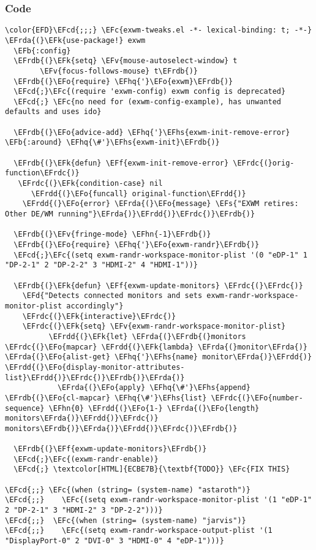 \documentclass[a4wide,10pt]{article}
\newcommand{\EFc}[1]{\textcolor{EFc}{#1}} %
\newcommand{\EFcd}[1]{\textcolor{EFcd}{#1}} %
\newcommand{\EFs}[1]{\textcolor{EFs}{#1}} %
\newcommand{\EFd}[1]{\textcolor{EFd}{#1}} %
\newcommand{\EFk}[1]{\textcolor{EFk}{#1}} %
\newcommand{\EFb}[1]{\textcolor{EFb}{#1}} %
\newcommand{\EFf}[1]{\textcolor{EFf}{#1}} %
\newcommand{\EFv}[1]{\textcolor{EFv}{#1}} %
\newcommand{\EFo}[1]{\textcolor{EFo}{#1}} %
\newcommand{\EFhn}[1]{\textcolor{EFhn}{\textbf{#1}}} %
\newcommand{\EFhq}[1]{\textcolor{EFhq}{#1}} %
\newcommand{\EFhs}[1]{\textcolor{EFhs}{#1}} %
\newcommand{\EFrda}[1]{\textcolor{EFrda}{#1}} %
\newcommand{\EFrdb}[1]{\textcolor{EFrdb}{#1}} %
\newcommand{\EFrdc}[1]{\textcolor{EFrdc}{#1}} %
\newcommand{\EFrdd}[1]{\textcolor{EFrdd}{#1}} %
\begin{document}
\subsubsection{Code}
\label{sec:org6f3a383}
\begin{Code}
\begin{Verbatim}
\color{EFD}\EFcd{;;;} \EFc{exwm-tweaks.el -*- lexical-binding: t; -*-}
\EFrda{(}\EFk{use-package!} exwm
  \EFb{:config}
  \EFrdb{(}\EFk{setq} \EFv{mouse-autoselect-window} t
        \EFv{focus-follows-mouse} t\EFrdb{)}
  \EFrdb{(}\EFo{require} \EFhq{'}\EFo{exwm}\EFrdb{)}
  \EFcd{;}\EFc{(require 'exwm-config) exwm config is deprecated}
  \EFcd{;} \EFc{no need for (exwm-config-example), has unwanted defaults and uses ido}

  \EFrdb{(}\EFo{advice-add} \EFhq{'}\EFhs{exwm-init-remove-error} \EFb{:around} \EFhq{\#'}\EFhs{exwm-init}\EFrdb{)}

  \EFrdb{(}\EFk{defun} \EFf{exwm-init-remove-error} \EFrdc{(}orig-function\EFrdc{)}
   \EFrdc{(}\EFk{condition-case} nil
      \EFrdd{(}\EFo{funcall} original-function\EFrdd{)}
    \EFrdd{(}\EFo{error} \EFrda{(}\EFo{message} \EFs{"EXWM retires: Other DE/WM running"}\EFrda{)}\EFrdd{)}\EFrdc{)}\EFrdb{)}

  \EFrdb{(}\EFv{fringe-mode} \EFhn{-1}\EFrdb{)}
  \EFrdb{(}\EFo{require} \EFhq{'}\EFo{exwm-randr}\EFrdb{)}
  \EFcd{;}\EFc{(setq exwm-randr-workspace-monitor-plist '(0 "eDP-1" 1 "DP-2-1" 2 "DP-2-2" 3 "HDMI-2" 4 "HDMI-1"))}

  \EFrdb{(}\EFk{defun} \EFf{exwm-update-monitors} \EFrdc{(}\EFrdc{)}
    \EFd{"Detects connected monitors and sets exwm-randr-workspace-monitor-plist accordingly"}
    \EFrdc{(}\EFk{interactive}\EFrdc{)}
    \EFrdc{(}\EFk{setq} \EFv{exwm-randr-workspace-monitor-plist}
          \EFrdd{(}\EFk{let} \EFrda{(}\EFrdb{(}monitors \EFrdc{(}\EFo{mapcar} \EFrdd{(}\EFk{lambda} \EFrda{(}monitor\EFrda{)} \EFrda{(}\EFo{alist-get} \EFhq{'}\EFhs{name} monitor\EFrda{)}\EFrdd{)} \EFrdd{(}\EFo{display-monitor-attributes-list}\EFrdd{)}\EFrdc{)}\EFrdb{)}\EFrda{)}
            \EFrda{(}\EFo{apply} \EFhq{\#'}\EFhs{append} \EFrdb{(}\EFo{cl-mapcar} \EFhq{\#'}\EFhs{list} \EFrdc{(}\EFo{number-sequence} \EFhn{0} \EFrdd{(}\EFo{1-} \EFrda{(}\EFo{length} monitors\EFrda{)}\EFrdd{)}\EFrdc{)} monitors\EFrdb{)}\EFrda{)}\EFrdd{)}\EFrdc{)}\EFrdb{)}

  \EFrdb{(}\EFf{exwm-update-monitors}\EFrdb{)}
  \EFcd{;}\EFc{(exwm-randr-enable)}
  \EFcd{;} \textcolor[HTML]{ECBE7B}{\textbf{TODO}} \EFc{FIX THIS}

\EFcd{;;} \EFc{(when (string= (system-name) "astaroth")}
\EFcd{;;}    \EFc{(setq exwm-randr-workspace-monitor-plist '(1 "eDP-1" 2 "DP-2-1" 3 "HDMI-2" 3 "DP-2-2")))}
\EFcd{;;}  \EFc{(when (string= (system-name) "jarvis")}
\EFcd{;;}    \EFc{(setq exwm-randr-workspace-output-plist '(1 "DisplayPort-0" 2 "DVI-0" 3 "HDMI-0" 4 "eDP-1")))}


\end{Verbatim}
\end{Code}
\end{document}
